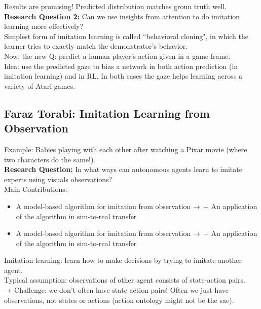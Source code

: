 Results are promising! Predicted distribution matches groun truth well. \\

{\bf Research Question 2:} Can we use insights from attention to do imitation learning more effectively? \\

Simplest form of imitation learning is called ``behavioral cloning", in which the learner tries to exactly match the demonstrator's behavior. \\

Now, the new Q: predict a human player's action given in a game frame. \\

Idea: use the predicted gaze to bias a network in both action prediction (in imitation learning) and in RL. In both cases the gaze helps learning across a variety of Atari games.

\spacerule
\subsection{Faraz Torabi: Imitation Learning from Observation}

Example: Babies playing with each other after watching a Pixar movie (where two characters do the same!). \\

{\bf Research Question:} In what ways can autonomous agents learn to imitate experts using visuals observations? \\

Main Contributions:
\begin{itemize}
    \item A model-based algorithm for imitation from observation
    $\rightarrow$ + An application of the algorithm in sim-to-real transfer
    \item A model-based algorithm for imitation from observation
    $\rightarrow$ + An application of the algorithm in sim-to-real transfer
\end{itemize}

Imitation learning: learn how to make decisions by trying to imitate another agent. \\

Typical assumption: observations of other agent consists of state-action pairs. \\

$\rightarrow$ Challenge: we don't often have state-action pairs! Often we just have observations, not states or actions (action ontology might not be the sae). \\

